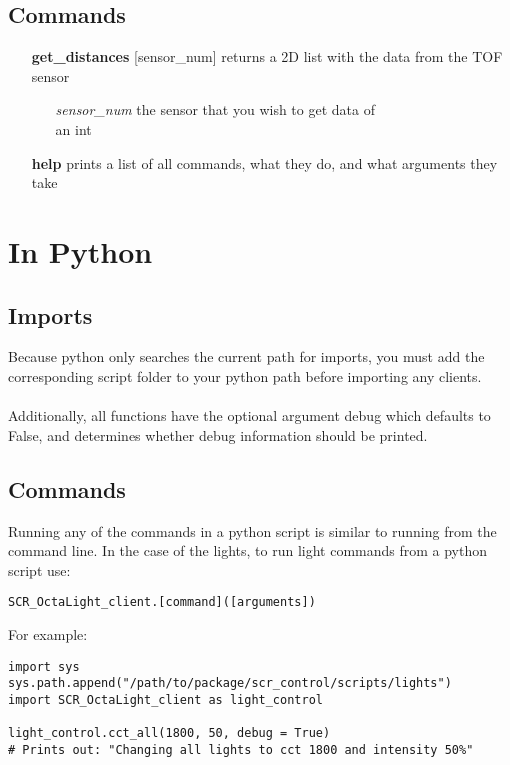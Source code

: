 \documentclass[twoside]{article}
\begin{document}
	\subsection{Commands}
	
	\begin{enumerate}
		
		\item[\bf get\_distances] [sensor\_num]
		returns a 2D list with the data from the TOF sensor
		
		\begin{enumerate}[leftmargin=3\parindent]
			\item[\it sensor\_num] the sensor that you wish to get data of\\ 
			an int
		\end{enumerate}
		
		\item[\bf help] prints a list of all commands, what they do, and what arguments they take
	\end{enumerate}

	\section{In Python}


\subsection{Imports}
Because python only searches the current path for imports, you must add the corresponding script folder to your python path before importing any clients. \\ \\
Additionally, all functions have the optional argument debug which defaults to False, and determines whether debug information should be printed.

\subsection{Commands}
Running any of the commands in a python script is similar to running from the command line. In the case of the lights, to run light commands from a python script use:
\begin{verbatim}
SCR_OctaLight_client.[command]([arguments])
\end{verbatim}


For example:
\begin{verbatim}
import sys
sys.path.append("/path/to/package/scr_control/scripts/lights")
import SCR_OctaLight_client as light_control

light_control.cct_all(1800, 50, debug = True) 
# Prints out: "Changing all lights to cct 1800 and intensity 50%"
\end{verbatim}

	
\end{document}
